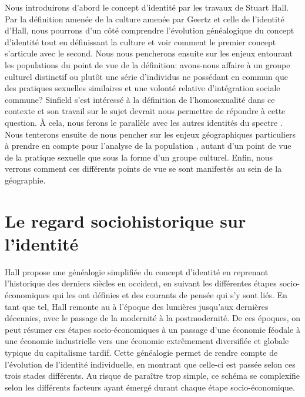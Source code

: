 Nous introduirons d'abord le concept d'identité par les travaux de Stuart Hall.
Par la définition amenée de la culture amenée par Geertz et celle de l'identité d'Hall, nous pourrons d'un côté comprendre l'évolution généalogique du concept d'identité tout en définissant la culture et voir comment le premier concept s'articule avec le second.
Nous nous pencherons ensuite sur les enjeux entourant les populations \lgbt{} du point de vue de la définition: avons-nous affaire à un groupe culturel distinctif ou plutôt une série d'individus ne possédant en commun que des pratiques sexuelles similaires et une volonté relative d'intégration sociale commune?
Sinfield s'est intéressé à la définition de l'homosexualité dans ce contexte et son travail sur le sujet devrait nous permettre de répondre à cette question.
À cela, nous ferons le parallèle avec les autres identités du spectre \lgbt{}.
Nous tenterons ensuite de nous pencher sur les enjeux géographiques particuliers à prendre en compte pour l'analyse de la population \lgbt{}, autant d'un point de vue de la pratique sexuelle que sous la forme d'un groupe culturel.
Enfin, nous verrons comment ces différents points de vue se sont manifestés au sein de la géographie.

\section{Le regard sociohistorique sur l'identité}
\label{sec:le_regard_sociohistoirique_sur_l_identit_}
Hall propose une généalogie simplifiée du concept d'identité en reprenant l'historique des derniers siècles en occident, en suivant les différentes étapes socio-économiques qui les ont définies et des courants de pensée qui s'y sont liés.
En tant que tel, Hall remonte au  à l'époque des lumières jusqu'aux dernières décennies, avec le passage de la modernité à la postmodernité.
De ces époques, on peut résumer ces étapes socio-économiques à un passage d'une économie féodale à une économie industrielle vers une économie extrêmement diversifiée et globale typique du capitalisme tardif.
Cette généalogie permet de rendre compte de l'évolution de l'identité individuelle, en montrant que celle-ci est passée selon ces trois stades différents.
Au risque de paraître trop simple, ce schéma se complexifie selon les différents facteurs ayant émergé durant chaque étape socio-économique.

